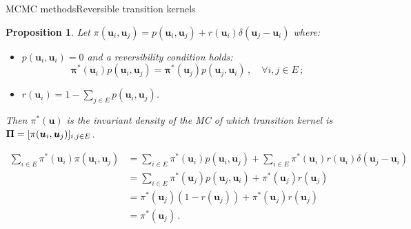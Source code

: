 \documentclass{beamer}
\newcommand{\ugj}{u}
\newcommand{\ug}{{\boldsymbol\ugj}}
\newcommand{\TK}{{\boldsymbol\Pi}}
\newcommand{\TKij}{\pi}
\newcommand{\TKi}{{\boldsymbol\pi}}
\newcommand{\SMi}{\TKij^*}
\newcommand{\SM}{\TKi^*}
\newtheorem{myprop}{Proposition}
\begin{document}
\begin{frame}{MCMC methods}{Reversible transition kernels}

\begin{myprop}
Let $\TKij(\ug_i,\ug_j)=p(\ug_i,\ug_j)+r(\ug_i)\delta(\ug_j-\ug_i)$ where:
\begin{itemize}
\item $p(\ug_i,\ug_i)=0$ and a \emph{reversibility condition} holds:
\begin{displaymath}
\SM(\ug_i)p(\ug_i,\ug_j)=\SM(\ug_j)p(\ug_j,\ug_i)\,,\quad\forall i,j\in E\,;
\end{displaymath}
\item $r(\ug_i)=1-\sum_{j\in E}p(\ug_i,\ug_j)$.
\end{itemize}
Then $\SMi(\ug)$ is the invariant density of the MC of which transition kernel is $\TK=\smash{[\TKij(\ug_i,\ug_j)]_{i,j\in E}}$.
\end{myprop}
\vspace{-0.5truecm}
\footnotesize{
\begin{displaymath}
\begin{split}
\sum_{i\in E}\SMi(\ug_i)\TKij(\ug_i,\ug_j) &=\sum_{i\in E}\SMi(\ug_i)p(\ug_i,\ug_j)+\sum_{i\in E}\SMi(\ug_i)r(\ug_i)\delta(\ug_j-\ug_i) \\
&=\sum_{i\in E}\SMi(\ug_j)p(\ug_j,\ug_i)+\SMi(\ug_j)r(\ug_j) \\
&=\SMi(\ug_j)(1-r(\ug_j))+\SMi(\ug_j)r(\ug_j) \\
&=\SMi(\ug_j)\,.
\end{split}
\end{displaymath}}

\end{frame}
\end{document}
